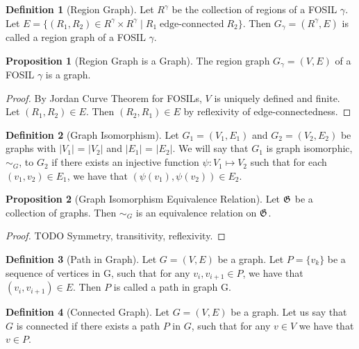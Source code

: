 \documentclass{article}
\theoremstyle{definition}
\newtheorem{definition}{Definition}
\theoremstyle{proposition}
\newtheorem{proposition}{Proposition}
\theoremstyle{theorem}
\begin{document}
\begin{definition}[Region Graph]
Let $R^{\gamma}$ be the collection of regions of a FOSIL $\gamma$. Let $E = \{(R_{1}, R_{2}) \in R^{\gamma} \times R^{\gamma} \mid R_{1} \operatorname{edge-connected} R_{2}\}$. Then $G_{\gamma}=(R^{\gamma},E)$ is called a region graph of a FOSIL $\gamma$.
\end{definition}

\begin{proposition}[Region Graph is a Graph]
The region graph $G_{\gamma} = (V, E)$ of a FOSIL $\gamma$ is a graph.
\end{proposition}

\begin{proof}
By Jordan Curve Theorem for FOSILs, $V$ is uniquely defined and finite. Let $(R_{1}, R_{2}) \in E$. Then $(R_{2}, R_{1}) \in E$ by reflexivity of edge-connectedness.
\end{proof}

\begin{definition}[Graph Isomorphism]
Let $G_{1}=(V_{1}, E_{1})$ and $G_{2}=(V_{2}, E_{2})$ be graphs with $\lvert V_{1} \rvert$ = $\lvert V_{2} \rvert$ and $\lvert E_{1} \rvert$ = $\lvert E_{2} \rvert$. We will say that $G_{1}$ is graph isomorphic, $\sim_{G}$, to $G_{2}$ if there exists an injective function $\psi : V_{1} \mapsto V_{2}$ such that for each $(v_{1}, v_{2}) \in E_{1}$, we have that $(\psi(v_{1}), \psi(v_{2})) \in E_{2}$.
\end{definition}

\begin{proposition}[Graph Isomorphism Equivalence Relation]
Let $\frak{G}$ be a collection of graphs. Then $\sim_{G}$ is an equivalence relation on $\frak{G}$.
\end{proposition}
\begin{proof}
TODO Symmetry, transitivity, reflexivity.
\end{proof}

\begin{definition}[Path in Graph]
Let $G=(V, E)$ be a graph. Let $P=\{v_{k}\}$ be a sequence of vertices in G, such that for any $v_{i}, v_{i+1} \in P$, we have that $(v_{i}, v_{i+1}) \in E$. Then $P$ is called a path in graph G.
\end{definition}

\begin{definition}[Connected Graph]
Let $G=(V, E)$ be a graph. Let us say that $G$ is connected if there exists a path $P$ in $G$, such that for any $v \in V$ we have that $v \in P$.
\end{definition}
\end{document}
